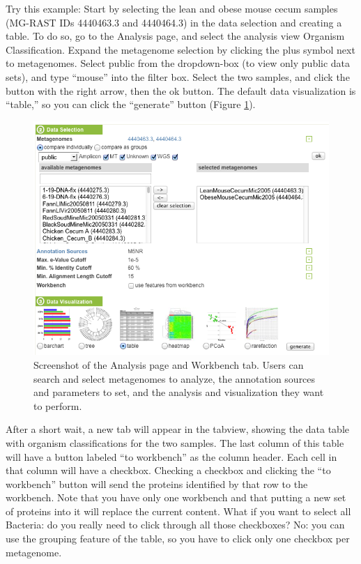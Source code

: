 \documentclass[12pt,fullpage]{report}
\begin{document}
Try this example: Start by selecting the lean and obese mouse cecum samples (MG-RAST IDs 4440463.3 and 4440464.3) \cite{OBESEMICE} in the data selection and creating a table. To do so, go to the Analysis page, and select the analysis view Organism Classification. Expand the metagenome selection by clicking the plus symbol next to metagenomes. Select public from the dropdown-box (to view only public data sets), and type ``mouse'' into the filter box. Select the two samples, and click the button with the right arrow, then the ok button. The default data visualization is ``table,'' so you can click the ``generate'' button (Figure \ref{fig:analysis-page-selecting-lean-and-obese}).

\begin{figure}
\begin{center}
\includegraphics[width=6in]{Images/analysis-page-selecting-lean-and-obese.png}
\end{center}
\caption{
Screenshot of the Analysis page and Workbench tab. Users can search and select metagenomes to analyze, the annotation sources and parameters to set, and the analysis and visualization they want to perform.
}
\label{fig:analysis-page-selecting-lean-and-obese}
\end{figure}


After a short wait, a new tab will appear in the tabview, showing the data table with organism classifications for the two samples. The last column of this table will have a button labeled ``to workbench'' as the column header. Each cell in that column will have a checkbox. Checking a checkbox and clicking the ``to workbench'' button will send the proteins identified by that row to the workbench.
Note that you have only one workbench and that putting a new set of proteins into it will replace the current content. What if you want to select all Bacteria: do you really need to click through all those checkboxes? No: you can use the grouping feature of the table, so you have to click only one checkbox per metagenome.
\end{document}
